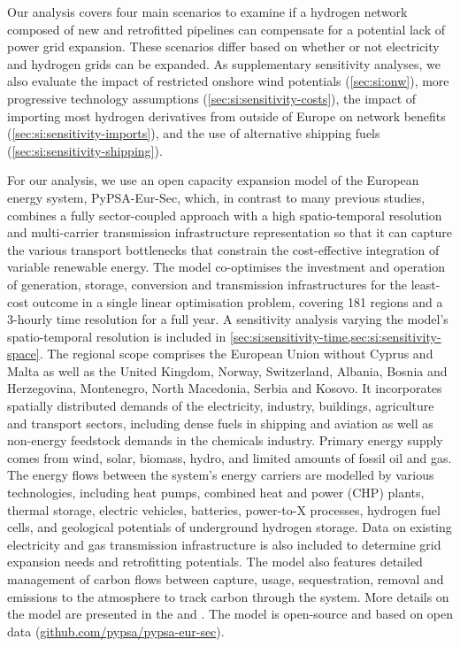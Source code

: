 Our analysis covers four main scenarios to examine if a hydrogen network
composed of new and retrofitted pipelines can compensate for a potential lack of
power grid expansion. These scenarios differ based on whether or not electricity
and hydrogen grids can be expanded. As supplementary sensitivity analyses, we
also evaluate the impact of restricted onshore wind potentials
(\cref{sec:si:onw}), more progressive technology assumptions
(\cref{sec:si:sensitivity-costs}), the impact of importing most hydrogen
derivatives from outside of Europe on network benefits (\cref{sec:si:sensitivity-imports}), and the use
of alternative shipping fuels (\cref{sec:si:sensitivity-shipping}).

For our analysis, we use an open capacity expansion model of the European energy
system, PyPSA-Eur-Sec, which, in contrast to many previous studies,
\cite{henningComprehensiveModel2014,mathiesenSmartEnergy2015,connollySmartEnergy2016,Loffler_2019,blancoPotentialHydrogen2018,brownSynergiesSector2018,in-depth_2018,victoria2020,ludererImpactDeclining2021,gea-bermudezRoleSector2021}
combines a fully sector-coupled approach with a high spatio-temporal resolution
and multi-carrier transmission infrastructure representation so that it can
capture the various transport bottlenecks that constrain the cost-effective
integration of variable renewable energy.\cite{frysztackiStrongEffect2021} The
model co-optimises the investment and operation of generation, storage,
conversion and transmission infrastructures for the least-cost outcome in a
single linear optimisation problem, covering 181 regions and a 3-hourly time
resolution for a full year. A sensitivity analysis varying the model's
spatio-temporal resolution is included in
\cref{sec:si:sensitivity-time,sec:si:sensitivity-space}. The regional scope
comprises the European Union without Cyprus and Malta as well as the United
Kingdom, Norway, Switzerland, Albania, Bosnia and Herzegovina, Montenegro, North
Macedonia, Serbia and Kosovo. It incorporates spatially distributed demands of
the electricity, industry, buildings, agriculture and transport sectors,
including dense fuels in shipping and aviation as well as non-energy feedstock
demands in the chemicals industry. Primary energy supply comes from wind, solar,
biomass, hydro, and limited amounts of fossil oil and gas. The energy flows
between the system's energy carriers are modelled by various technologies,
including heat pumps, combined heat and power (CHP) plants, thermal storage,
electric vehicles, batteries, power-to-X processes, hydrogen fuel cells, and
geological potentials of underground hydrogen storage. Data on existing
electricity and gas transmission infrastructure is also included to determine
grid expansion needs and retrofitting potentials. The model also features
detailed management of carbon flows between capture, usage, sequestration,
removal and emissions to the atmosphere to track carbon through the system. More
details on the model are presented in the  and
. The model is open-source and based on open data
(\href{https://github.com/pypsa/pypsa-eur-sec}{github.com/pypsa/pypsa-eur-sec}).

